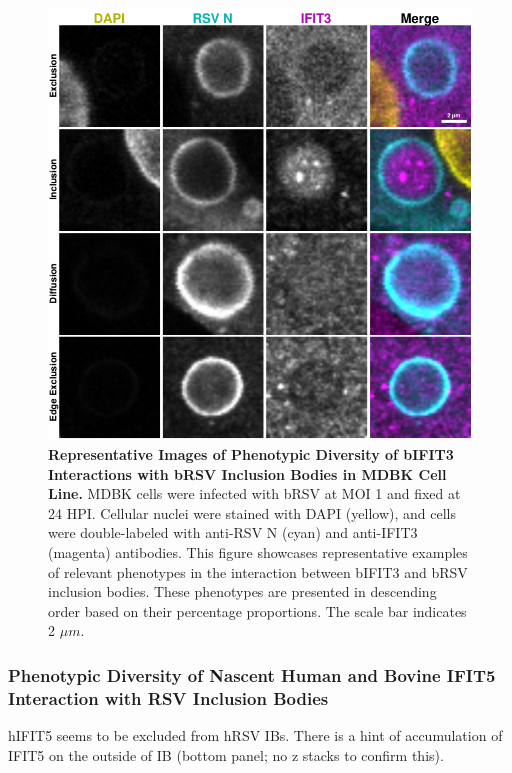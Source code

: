 \begin{figure}
    \centering
    \includegraphics[width=1\linewidth]{08. Chapter 3/Figs/02. Infection/03. IFIT3/09. mdbk i3.pdf}
    \caption[Representative Images of Phenotypic Diversity of bIFIT3 Interactions with bRSV Inclusion Bodies in MDBK Cell Line.]{\textbf{Representative Images of Phenotypic Diversity of bIFIT3 Interactions with bRSV Inclusion Bodies in MDBK Cell Line.} MDBK cells were infected with bRSV at MOI 1 and fixed at 24 HPI. Cellular nuclei were stained with DAPI (yellow), and cells were double-labeled with anti-RSV N (cyan) and anti-IFIT3 (magenta) antibodies. This figure showcases representative examples of relevant phenotypes in the interaction between bIFIT3 and bRSV inclusion bodies. These phenotypes are presented in descending order based on their percentage proportions. The scale bar indicates 2 \(\mu m\).}
    \label{fig:Representative Images of Phenotypic Diversity of bIFIT3 Interactions with bRSV Inclusion Bodies in MDBK Cell Line}
\end{figure}

\subsubsection{Phenotypic Diversity of Nascent Human and Bovine IFIT5 Interaction with RSV Inclusion Bodies}
hIFIT5 seems to be excluded from hRSV IBs. There is a hint of accumulation of IFIT5 on the outside of IB (bottom panel; no z stacks to confirm this). 


